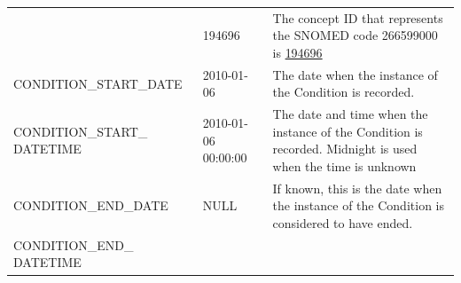 \documentclass[]{book}
\begin{document}
\begin{longtable}[]{@{}lll@{}}
\begin{minipage}[t]{0.27\columnwidth}
\end{minipage} & \begin{minipage}[t]{0.14\columnwidth}\raggedright\strut
194696\strut
\end{minipage} & \begin{minipage}[t]{0.50\columnwidth}\raggedright\strut
The concept ID that represents the SNOMED code 266599000 is
\href{http://athena.ohdsi.org/search-terms/terms/194696}{194696}\strut
\end{minipage}\tabularnewline
\begin{minipage}[t]{0.27\columnwidth}\raggedright\strut
CONDITION\_START\_DATE\strut
\end{minipage} & \begin{minipage}[t]{0.14\columnwidth}\raggedright\strut
2010-01-06\strut
\end{minipage} & \begin{minipage}[t]{0.50\columnwidth}\raggedright\strut
The date when the instance of the Condition is recorded.\strut
\end{minipage}\tabularnewline
\begin{minipage}[t]{0.27\columnwidth}\raggedright\strut
CONDITION\_START\_ DATETIME\strut
\end{minipage} & \begin{minipage}[t]{0.14\columnwidth}\raggedright\strut
2010-01-06 00:00:00\strut
\end{minipage} & \begin{minipage}[t]{0.50\columnwidth}\raggedright\strut
The date and time when the instance of the Condition is recorded.
Midnight is used when the time is unknown\strut
\end{minipage}\tabularnewline
\begin{minipage}[t]{0.27\columnwidth}\raggedright\strut
CONDITION\_END\_DATE\strut
\end{minipage} & \begin{minipage}[t]{0.14\columnwidth}\raggedright\strut
NULL\strut
\end{minipage} & \begin{minipage}[t]{0.50\columnwidth}\raggedright\strut
If known, this is the date when the instance of the Condition is
considered to have ended.\strut
\end{minipage}\tabularnewline
\begin{minipage}[t]{0.27\columnwidth}\raggedright\strut
CONDITION\_END\_ DATETIME\strut
\end{minipage} & \begin{minipage}[t]{0.14\columnwidth}\raggedright\strut

\end{minipage}
\end{longtable}
\end{document}
